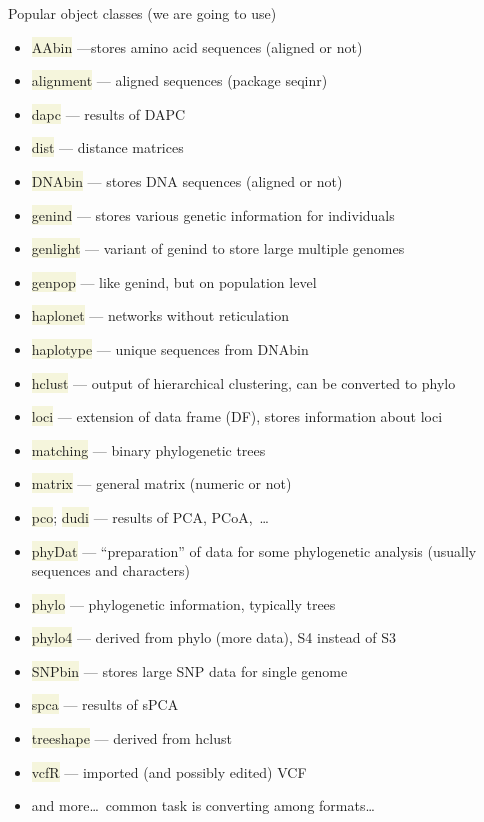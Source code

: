 \documentclass[compress, xelatex, 11pt, xcolor=svgnames, aspectratio=169,
	hyperref={
		bookmarks=true,
		unicode=true,
		colorlinks=true,
		pdftitle={Molecular data in R},
		plainpages=false,
		pdfauthor={Vojtech Zeisek},
		pdfsubject={Course about phylogeny and evolution in R},
		pdfcreator={XeLaTeX},
		pdfkeywords={R, evolution, phylogeny, molecular data},
		linkcolor=Crimson, %
		anchorcolor=Magenta, %
		citecolor=Magenta, %
		filecolor=Magenta, %
		menucolor=Magenta, %
		urlcolor=DodgerBlue, %
		},
	url={hyphens, lowtilde} %
	]{beamer}
\renewcommand{\texttt}[1]{\colorbox{Beige}{{\ttfamily #1}}}
\begin{document}
\begin{frame}[allowframebreaks]{Popular object classes (we are going to use)}
	\begin{itemize}
		\item \texttt{AAbin} ---stores amino acid sequences (aligned or not)
		\item \texttt{alignment} --- aligned sequences (package seqinr)
		\item \texttt{dapc} --- results of DAPC
		\item \texttt{dist} --- distance matrices
		\item \texttt{DNAbin} --- stores DNA sequences (aligned or not)
		\item \texttt{genind} --- stores various genetic information for individuals
		\item \texttt{genlight} --- variant of genind to store large multiple genomes
		\item \texttt{genpop} --- like genind, but on population level
		\item \texttt{haplonet} --- networks without reticulation
		\item \texttt{haplotype} --- unique sequences from DNAbin
		\item \texttt{hclust} --- output of hierarchical clustering, can be converted to phylo
		\item \texttt{loci} --- extension of data frame (DF), stores information about loci
		\item \texttt{matching} --- binary phylogenetic trees
		\item \texttt{matrix} --- general matrix (numeric or not)
		\item \texttt{pco}; \texttt{dudi} --- results of PCA, PCoA,~\ldots
		\item \texttt{phyDat} --- \enquote{preparation} of data for some phylogenetic analysis (usually sequences and characters)
		\item \texttt{phylo} --- phylogenetic information, typically trees
		\item \texttt{phylo4} --- derived from phylo (more data), S4 instead of S3
		\item \texttt{SNPbin} --- stores large SNP data for single genome
		\item \texttt{spca} --- results of sPCA
		\item \texttt{treeshape} --- derived from hclust
		\item \texttt{vcfR} --- imported (and possibly edited) VCF
		\item and more\ldots~common task is converting among formats\ldots

\end{itemize}
\end{frame}
\end{document}
